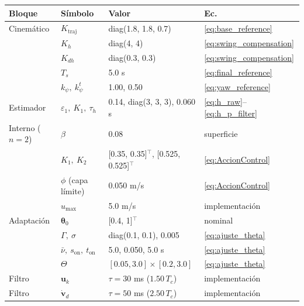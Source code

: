 \begin{tabular}{llll}
\toprule
Bloque & S\'imbolo & Valor & Ec. \\
\midrule
Cinem\'atico & $K_{\mathrm{traj}}$ & diag(1.8, 1.8, 0.7) & \eqref{eq:base_reference} \\
 & $K_h$ & diag(4, 4) & \eqref{eq:swing_compensation} \\
 & $K_{dh}$ & diag(0.3, 0.3) & \eqref{eq:swing_compensation} \\
 & $T_s$ & 5.0 s & \eqref{eq:final_reference} \\
 & $k_\psi,\ k_\psi^t$ & 1.00, 0.50 & \eqref{eq:yaw_reference} \\
Estimador & $\varepsilon_1,\ K_1,\ \tau_h$ & 0.14, diag(3, 3, 3), 0.060 s & \eqref{eq:h_raw}--\eqref{eq:h_p_filter} \\
Interno ($n=2$) & $\beta$ & 0.08 & superficie \\
 & $K_1,\ K_2$ & [0.35, 0.35]$^\top$, [0.525, 0.525]$^\top$ & \eqref{eq:AccionControl} \\
 & $\phi$ (capa l\'imite) & 0.050 m/s & \eqref{eq:AccionControl} \\
 & $u_{\max}$ & 5.0 m/s & implementaci\'on \\
Adaptaci\'on & $\boldsymbol{\theta}_0$ & [0.4, 1]$^\top$ & nominal \\
 & $\Gamma,\ \sigma$ & diag(0.1, 0.1), 0.005 & \eqref{eq:ajuste_theta} \\
 & $\bar\nu,\ s_{\mathrm{on}},\ t_{\mathrm{on}}$ & 5.0, 0.050, 5.0 s & \eqref{eq:ajuste_theta} \\
 & $\Theta$ & $[0.05,3.0]\times[0.2,3.0]$ & \eqref{eq:ajuste_theta} \\
Filtro & $\mathbf{u}_k$ & $\tau = 30$ ms ($1.50\,T_c$) & implementaci\'on \\
Filtro & $\dot{\mathbf{v}}_d$ & $\tau = 50$ ms ($2.50\,T_c$) & implementaci\'on \\
\bottomrule
\end{tabular}
